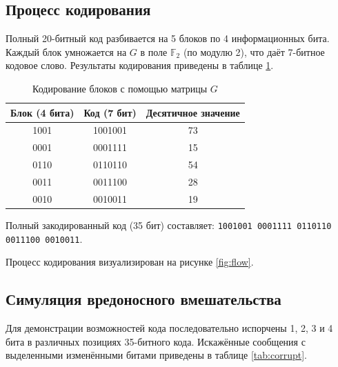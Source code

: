 \subsection{Процесс кодирования}
Полный 20-битный код разбивается на 5 блоков по 4 информационных бита. Каждый блок умножается на $G$ в поле $\mathbb{F}_2$ (по модулю 2), что даёт 7-битное кодовое слово. Результаты кодирования приведены в таблице \ref{tab:encode}.

\begin{table}[H]
    \centering
    \small
    \caption{Кодирование блоков с помощью матрицы $G$}
    \label{tab:encode}
    \begin{tabular}{|c|c|c|}
        \toprule
        Блок (4 бита) & Код (7 бит) & Десятичное значение \\
        \midrule
        1001 & 1001001 & 73 \\
        0001 & 0001111 & 15 \\
        0110 & 0110110 & 54 \\
        0011 & 0011100 & 28 \\
        0010 & 0010011 & 19 \\
        \bottomrule
    \end{tabular}
\end{table}

Полный закодированный код (35 бит) составляет:
\texttt{1001001 0001111 0110110 0011100 0010011}.

Процесс кодирования визуализирован на рисунке \ref{fig:flow}.

\begin{center}
\end{center}
\label{fig:flow}

\subsection{Симуляция вредоносного вмешательства}
Для демонстрации возможностей кода последовательно испорчены 1, 2, 3 и 4 бита в различных позициях 35-битного кода. Искажённые сообщения с выделенными изменёнными битами приведены в таблице \ref{tab:corrupt}.

